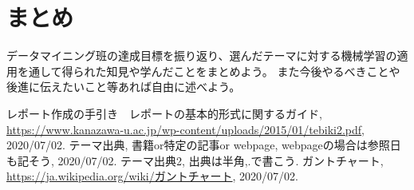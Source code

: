 \documentclass[a4paper, 11pt, titlepage]{jsarticle}
\begin{document}
\section{まとめ}
データマイニング班の達成目標を振り返り、選んだテーマに対する機械学習の適用を通して得られた知見や学んだことをまとめよう。
また今後やるべきことや後進に伝えたいこと等あれば自由に述べよう。

\begin{thebibliography}{n}
  レポート作成の手引き　レポートの基本的形式に関するガイド, \url{https://www.kanazawa-u.ac.jp/wp-content/uploads/2015/01/tebiki2.pdf}, 2020/07/02.
	テーマ出典, 書籍or特定の記事or webpage, webpageの場合は参照日も記そう, 2020/07/02.
	テーマ出典2, 出典は半角,.で書こう.
	ガントチャート, \url{https://ja.wikipedia.org/wiki/ガントチャート}, 2020/07/02.
\end{thebibliography}
\end{document}
